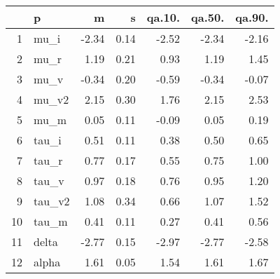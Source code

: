 \begin{table}[ht]
\centering
\begin{tabular}{rlrrrrr}
  \hline
 & p & m & s & qa.10. & qa.50. & qa.90. \\ 
  \hline
1 & mu\_i & -2.34 & 0.14 & -2.52 & -2.34 & -2.16 \\ 
  2 & mu\_r & 1.19 & 0.21 & 0.93 & 1.19 & 1.45 \\ 
  3 & mu\_v & -0.34 & 0.20 & -0.59 & -0.34 & -0.07 \\ 
  4 & mu\_v2 & 2.15 & 0.30 & 1.76 & 2.15 & 2.53 \\ 
  5 & mu\_m & 0.05 & 0.11 & -0.09 & 0.05 & 0.19 \\ 
  6 & tau\_i & 0.51 & 0.11 & 0.38 & 0.50 & 0.65 \\ 
  7 & tau\_r & 0.77 & 0.17 & 0.55 & 0.75 & 1.00 \\ 
  8 & tau\_v & 0.97 & 0.18 & 0.76 & 0.95 & 1.20 \\ 
  9 & tau\_v2 & 1.08 & 0.34 & 0.66 & 1.07 & 1.52 \\ 
  10 & tau\_m & 0.41 & 0.11 & 0.27 & 0.41 & 0.56 \\ 
  11 & delta & -2.77 & 0.15 & -2.97 & -2.77 & -2.58 \\ 
  12 & alpha & 1.61 & 0.05 & 1.54 & 1.61 & 1.67 \\ 
   \hline
\end{tabular}
\label{tab:param}
\end{table}
